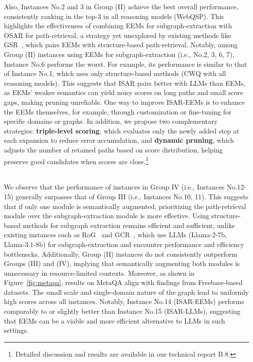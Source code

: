Also, Instances No.2 and 3 in Group (II) achieve the best overall performance, consistently ranking in the top-3 in all reasoning models (WebQSP). 
This highlights the effectiveness of combining EEMs for subgraph-extraction with OSAR for path-retrieval, a strategy yet unexplored by existing methods like GSR~\cite{LessIsMore}, which pairs EEMs with structure-based path-retrieval.
Notably, among Group (II) instances using EEMs for subgraph-extraction (i.e., No.2, 3, 6, 7), Instance No.6 performs the worst. For example, its performance is similar to that of Instance No.1, which uses only structure-based methods (CWQ with all reasoning models). 
This suggests that ISAR pairs better with LLMs than EEMs, as EEMs' weaker semantics can yield noisy scores on long paths and small score gaps, making pruning unreliable. 
One way to improve ISAR-EEMs is to enhance the EEMs themselves, for example, through customization or fine-tuning for specific domains or graphs. In addition, we propose two complementary strategies: {\bf triple-level scoring}, which evaluates only the newly added step at each expansion to reduce error accumulation, and {\bf dynamic pruning}, which adjusts the number of retained paths based on score distribution, helping preserve good candidates when scores are close.\footnote{Detailed discussion and results are available in our technical report B.8.}


\\ We observe that the performance of instances in Group IV (i.e., Instances No.12-15) generally surpasses that of Group III (i.e., Instances No.10, 11).
This suggests that if only one module is semantically augmented, prioritizing the path-retrieval module over the subgraph-extraction module is more effective.  
Using structure-based methods for subgraph extraction remains efficient and sufficient, unlike existing instances such as RoG~\cite{RoG} and GCR~\cite{GCR}, which use LLMs (Llama-2-7b, Llama-3.1-8b) for subgraph-extraction and encounter performance and efficiency bottlenecks.
Additionally, Group (II) instances do not consistently outperform Groups (III) and (IV), implying that semantically augmenting both modules is unnecessary in resource-limited contexts.
Moreover, as shown in Figure~\ref{fig:metaqa}, results on MetaQA align with findings from Freebase-based datasets. The small scale and single-domain nature of the graph lead to uniformly high scores across all instances. Notably, Instance No.14 (ISAR-EEMs) performs comparably to or slightly better than Instance No.15 (ISAR-LLMs), suggesting that EEMs can be a viable and more efficient alternative to LLMs in such settings. 


